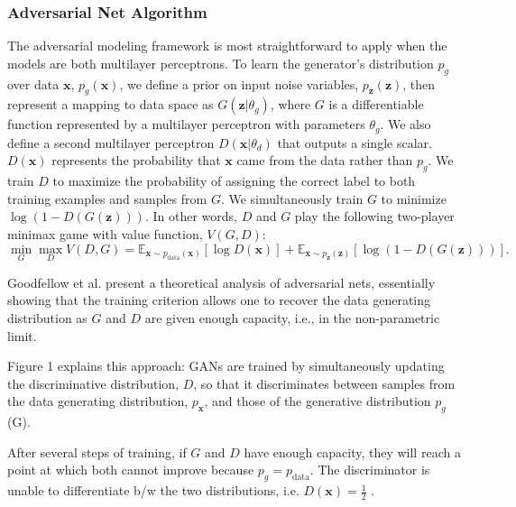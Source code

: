 \subsubsection*{Adversarial Net Algorithm}
The adversarial modeling framework is most straightforward to apply when the models are both multilayer perceptrons. To learn the generator’s distribution $p_g$ over data $\bm{x}$, $p_g(\bm{x})$, we define a prior on input noise variables, $p_{\bm{z}}(\bm{z})$, then represent a mapping to data space as $G(\bm{z}| \theta_g)$, where $G$ is a differentiable function represented by a multilayer perceptron with parameters $\theta_g$. We also define a second multilayer perceptron $D(\bm{x} | \theta_d)$ that outputs a single scalar. $D(\bm{x})$ represents the probability that $\bm{x}$ came from the data rather than $p_g$. We train $D$ to maximize the probability of assigning the correct label to both training examples and samples from $G$. We simultaneously train $G$ to minimize $ \log(1 - D(G(\bm{z})))$. In other words, $D$ and $G$ play the following two-player minimax game with value function, $V(G,D)$:
\[
	\min_G\max_D V(D,G) =
	\mathbb{E}_{\bm{x}\sim p_{\text{data}}(\bm{x})}
	\left[ \log D(\bm{x}) \right]
	+
	\mathbb{E}_{\bm{x}\sim p_{\bm{z}}(\bm{z})}
	\left[ \log\left( 1 - D(G(\bm{z})) \right) \right].
\]

Goodfellow et al. present a theoretical analysis of adversarial nets, essentially showing that the training criterion allows one to recover the data generating distribution as $G$ and $D$ are given enough capacity, i.e., in the non-parametric limit.

Figure 1 explains this approach: GANs are trained by simultaneously updating the discriminative distribution, $D$, so that it discriminates between samples from the data generating distribution, $p_{\bm{x}}$, and those of the generative distribution $p_g$ (G).

After several steps of training, if $G$ and $D$ have enough capacity, they will reach a point at which both cannot improve because $p_g=p_{\text{data}}$. The discriminator is unable to differentiate b/w the two distributions, i.e. \texttt{$D(\bm{x})=\frac{1}{2}$} .


